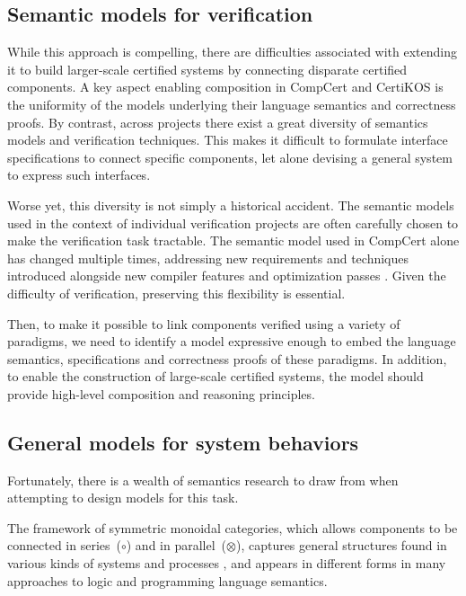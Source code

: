 \documentclass[sigplan,10pt,review,anonymous]{acmart}
\begin{document}

\subsection{Semantic models for verification} %

While this approach is compelling,
there are difficulties associated with extending it
to build larger-scale certified systems
by connecting disparate certified components.
A key aspect enabling composition in CompCert and CertiKOS
is the uniformity of the models underlying
their language semantics and correctness proofs.
By contrast,
across projects
there exist a great diversity
of semantics models and verification techniques.
This makes it difficult to formulate
interface specifications to connect specific components,
let alone devising a general system
to express such interfaces.

Worse yet,
this diversity is not simply a historical accident.
The semantic models
used in the context of individual verification projects
are often carefully chosen
to make the verification task tractable.
The semantic model used in CompCert alone
has changed multiple times,
addressing new requirements and techniques introduced alongside
new compiler features and optimization passes \cite{compsem}.
Given the difficulty of verification,
preserving this flexibility is essential.

Then,
to make it possible to link components
verified using a variety of paradigms,
we need to identify a model
expressive enough to embed
the language semantics, specifications and correctness proofs
of these paradigms.
In addition,
to enable the construction of large-scale certified systems,
the model should provide
high-level composition and reasoning principles.


\subsection{General models for system behaviors} %

Fortunately,
there is a wealth of semantics research to draw from
when attempting to design models for this task.

The framework of
symmetric monoidal categories,
which allows components to be
connected in series~($\circ$) and in parallel~($\otimes$),
captures general structures found
in various kinds of systems and processes \cite{rosetta},
and appears in different forms
in many approaches to logic and programming language semantics.
\end{document}
